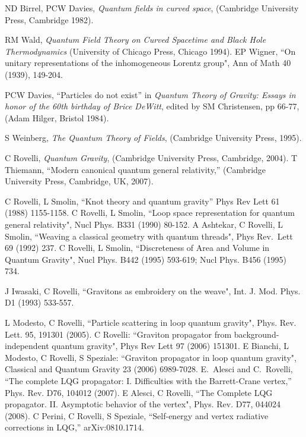\documentclass[11pt, nofootinbib]{revtex4-2}
\begin{document}
\begin{thebibliography}{9}


 ND Birrel, PCW Davies, {\it Quantum fields in curved
space}, (Cambridge University Press, Cambridge 1982).

 RM Wald, {\it Quantum Field Theory on Curved Spacetime
and Black Hole Thermodynamics} (University of Chicago Press, Chicago
1994).
 EP Wigner, ``On unitary representations of the 
inhomogeneous Lorentz group", Ann of Math {40} (1939), 149-204.

 PCW Davies, ``Particles do not exist'' in 
\textit{Quantum Theory of Gravity: Essays in honor of the 60th 
birthday of Brice DeWitt}, edited by SM Christensen,  pp 66-77, (Adam Hilger, 
Bristol 1984).

 S Weinberg, \textit{The Quantum Theory of 
Fields}, (Cambridge University Press, 1995). 


C Rovelli, {\em Quantum Gravity}, (Cambridge University Press,
Cambridge, 2004). 
T Thiemann, ``Modern canonical quantum general relativity,'' (Cambridge
  University Press, Cambridge, UK, 2007). 

C Rovelli, L Smolin,
 ``Knot theory and quantum gravity'' 
{Phys Rev Lett} {61} (1988) 1155-1158. 
C Rovelli, L Smolin,
``Loop space representation for quantum general relativity", 
{Nucl Phys.} {B331}  (1990) 80-152.
 A Ashtekar, C Rovelli, L Smolin,
 ``Weaving a classical geometry with quantum threads",
{Phys Rev.\ Lett}  {69}  (1992) 237.
C Rovelli, L Smolin,
 ``Discreteness of Area and Volume in Quantum Gravity", 
{Nucl Phys.} {B442} (1995)  593-619;
{Nucl Phys.} {B456}  (1995) 734.

J Iwasaki, C Rovelli, ``Gravitons as embroidery on the weave", 
Int. J. Mod. Phys. D1 (1993) 533-557.

L Modesto, C Rovelli, ``Particle scattering in
loop quantum gravity", Phys. Rev. Lett.  {95}, 191301 (2005).
C Rovelli:
``Graviton propagator from background-independent quantum gravity", 
Phys Rev Lett 97 (2006) 151301. 
E Bianchi, L Modesto, C Rovelli, S Speziale: 
``Graviton propagator in loop quantum gravity", 
Classical and  Quantum Gravity 23 (2006) 6989-7028.
  E.~Alesci and C.~Rovelli,
  ``The complete LQG propagator: I. Difficulties with the Barrett-Crane
  vertex,''
  Phys. Rev.  D76, 104012 (2007).
E Alesci, C Rovelli,
  ``The Complete LQG propagator. II. Asymptotic behavior of the vertex",  
Phys. Rev. D77,  044024 (2008). 
C Perini, C Rovelli, S Speziale,
  ``Self-energy and vertex radiative corrections in LQG,''   arXiv:0810.1714.
  

\end{thebibliography}
\end{document}
